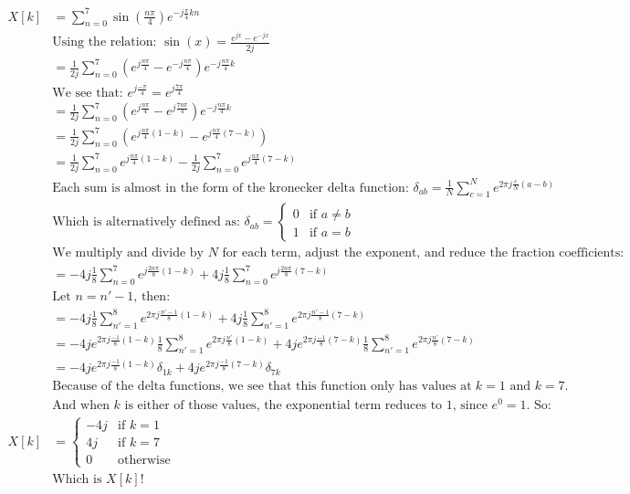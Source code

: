 \documentclass{article}
\begin{document}
\begin{align*}
    X[k] &= \sum_{n=0}^{7} \sin(\frac{n\pi}{4}) e^{-j\frac{\pi}{4}kn} \\
    &\textrm{Using the relation: } \sin(x) = \frac{e^{jx} - e^{-jx}}{2j} \\
    &= \frac{1}{2j} \sum_{n=0}^{7} (e^{j\frac{n\pi}{4}} - e^{-j\frac{n\pi}{4}}) e^{-j\frac{n\pi}{4}k} \\
    &\textrm{We see that: } e^{j\frac{-\pi}{4}} = e^{j\frac{7\pi}{4}} \\
    &= \frac{1}{2j} \sum_{n=0}^{7} (e^{j\frac{n\pi}{4}} - e^{j\frac{7n\pi}{4}}) e^{-j\frac{n\pi}{4}k} \\
    &= \frac{1}{2j} \sum_{n=0}^{7} (e^{j\frac{n\pi}{4}(1 - k)} - e^{j\frac{n\pi}{4}(7 - k)}) \\
    &= \frac{1}{2j} \sum_{n=0}^{7} e^{j\frac{n\pi}{4}(1 - k)} - \frac{1}{2j} \sum_{n=0}^{7} e^{j\frac{n\pi}{4}(7 - k)} \\
    &\textrm{Each sum is almost in the form of the kronecker delta function: } \delta_{ab} = \frac{1}{N} \sum_{c=1}^{N} e^{2\pi j \frac{c}{N} (a - b)} \\
    &\textrm{Which is alternatively defined as: } \delta_{ab} = \begin{cases}
        0 & \text{if } a \neq b \\
        1 & \text{if } a = b
    \end{cases} \\
    &\textrm{We multiply and divide by } N \textrm{ for each term, adjust the exponent, and reduce the fraction coefficients:} \\
    &= -4j \frac{1}{8} \sum_{n=0}^{7} e^{j\frac{2n\pi}{8}(1 - k)} + 4j \frac{1}{8} \sum_{n=0}^{7} e^{j\frac{2n\pi}{8}(7 - k)} \\
    &\textrm{Let } n = n' - 1 \textrm{, then:} \\
    &= -4j \frac{1}{8} \sum_{n'=1}^{8} e^{2\pi j\frac{n'- 1}{8}(1 - k)} + 4j\frac{1}{8} \sum_{n'=1}^{8} e^{2\pi j\frac{n' - 1}{8}(7 - k)} \\
    &= -4j e^{2\pi j\frac{-1}{8}(1 - k)} \frac{1}{8} \sum_{n'=1}^{8} e^{2\pi j\frac{n'}{8}(1 - k)} + 4j e^{2\pi j\frac{-1}{8}(7 - k)} \frac{1}{8} \sum_{n'=1}^{8} e^{2\pi j\frac{n'}{8}(7 - k)} \\
    &= -4j e^{2\pi j\frac{-1}{8}(1 - k)} \delta_{1k} + 4j e^{2\pi j\frac{-1}{8}(7 - k)} \delta_{7k} \\
    &\textrm{Because of the delta functions, we see that this function only has values at } k = 1 \textrm{ and } k = 7 \textrm{.} \\
    &\textrm{And when } k \textrm{ is either of those values, the exponential term reduces to } 1 \textrm{, since } e^{0} = 1 \textrm{. So: }\\
    X[k] &= \begin{cases}
        -4j & \text{if } k = 1 \\
        4j & \text{if } k = 7 \\
        0 & \text{otherwise}
    \end{cases} \\
    &\textrm{Which is } X[k] \textrm{!}
\end{align*}
\end{document}
